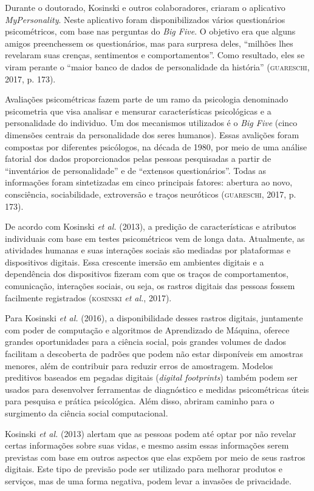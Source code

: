 Durante o doutorado, Kosinski e outros colaboradores, criaram o
aplicativo \emph{MyPersonality}. Neste aplicativo foram disponibilizados
vários questionários psicométricos, com base nas perguntas do \emph{Big
Five}. O objetivo era que alguns amigos preenchessem os questionários,
mas para surpresa deles, ``milhões lhes revelaram suas crenças,
sentimentos e comportamentos''. Como resultado, eles se viram perante o
``maior banco de dados de personalidade da história'' (\textsc{guareschi}, 2017, p. 173).

Avaliações psicométricas fazem parte de um ramo da psicologia denominado
psicometria que visa analisar e mensurar características psicológicas e a personalidade do individuo. Um dos
mecanismos utilizados é o \emph{Big Five} (cinco dimensões centrais da
personalidade dos seres humanos). Essas avalições foram compostas por
diferentes psicólogos, na década de 1980, por meio de uma análise
fatorial dos dados proporcionados pelas pessoas pesquisadas a partir de
``inventários de personalidade'' e de ``extensos questionários''. Todas
as informações foram sintetizadas em cinco principais fatores: abertura
ao novo, consciência, sociabilidade, extroversão e traços neuróticos
(\textsc{guareschi}, 2017, p. 173).

De acordo com Kosinski \emph{et al.} (2013), a predição de características e
atributos individuais com base em testes psicométricos vem de longa
data. Atualmente, as atividades humanas e suas interações sociais são
mediadas por plataformas e dispositivos digitais. Essa crescente imersão
em ambientes digitais e a dependência dos dispositivos fizeram com que
os traços de comportamentos, comunicação, interações sociais, ou seja,
os rastros digitais das pessoas fossem facilmente registrados (\textsc{kosinski}
\emph{et al.}, 2017).

Para Kosinski \emph{et al.} (2016), a disponibilidade desses rastros digitais,
juntamente com poder de computação e algoritmos de Aprendizado de
Máquina, oferece grandes oportunidades para a ciência social, pois
grandes volumes de dados facilitam a descoberta de padrões que podem não
estar disponíveis em amostras menores, além de contribuir para reduzir
erros de amostragem. Modelos preditivos baseados em pegadas digitais
(\emph{digital footprints}) também podem ser usados para desenvolver
ferramentas de diagnóstico e medidas psicométricas úteis para pesquisa e
prática psicológica. Além disso, abriram caminho para o surgimento da
ciência social computacional.

Kosinski \emph{et al.} (2013) alertam que as pessoas podem até optar por não
revelar certas informações sobre suas vidas, e mesmo assim essas
informações serem previstas com base em outros aspectos que elas expõem
por meio de seus rastros digitais. Este tipo de previsão pode ser
utilizado para melhorar produtos e serviços, mas de uma forma negativa,
podem levar a invasões de privacidade.

